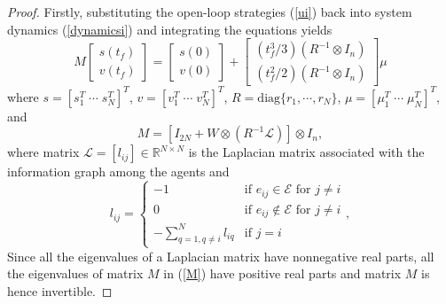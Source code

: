 \documentclass[letterpaper, 10 pt, conference,onecolumn]{ieeeconf}  %
\begin{document}
\begin{proof}
Firstly, substituting the open-loop strategies (\ref{ui}) back into system dynamics (\ref{dynamicsi}) and integrating the equations yields
{\begin{equation}
M\begin{bmatrix}
s(t_f)\\
v(t_f)
\end{bmatrix}=\begin{bmatrix}
s(0)\\
v(0)
\end{bmatrix}+\begin{bmatrix}
(t_f^3/3)(R^{-1}\otimes I_n)\\
(t_f^2/2)(R^{-1}\otimes I_n)
\end{bmatrix}\mu\label{sf}
\end{equation}}
where $s=[s_{1}^T\;\cdots\;s_{N}^T]^T$, $v=[v_{1}^T\;\cdots\;v_{N}^T]^T$, $R=\mbox{diag}\{r_1,\cdots,r_N\}$, $\mu=[\mu_{1}^T\;\cdots\;\mu_{N}^T]^T$, and
\begin{equation}
M=[I_{2N}+W\otimes (R^{-1}\mathcal{L})]\otimes I_n,\label{M}
\end{equation}
where matrix $\mathcal{L}=[l_{ij}]\in\mathbb{R}^{N\times N}$ is the Laplacian matrix associated with the information graph among the agents and
\begin{equation}
l_{ij}=\left\{\begin{array}{ll}
-1&\mbox{if $e_{ij}\in\mathcal{E}$ for $j\neq i$}\\
0&\mbox{if $e_{ij}\notin\mathcal{E}$ for $j\neq i$}\\
\displaystyle -\sum^N_{q=1,q\neq i}l_{iq}&\mbox{if $j=i$}
\end{array}\right.,\label{laplacian}
\end{equation}
Since all the eigenvalues of a Laplacian matrix have nonnegative real parts, all the eigenvalues of matrix $M$ in (\ref{M}) have positive real parts and matrix $M$ is hence invertible.


\end{proof}
\end{document}
